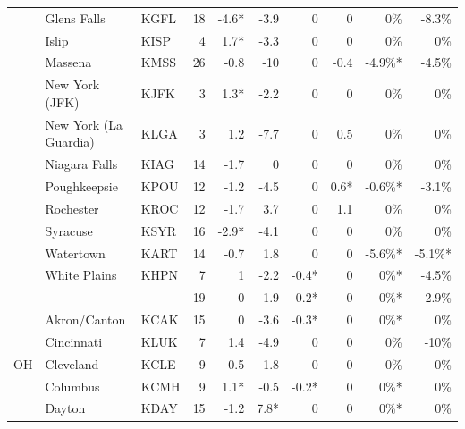 \documentclass[twocol]{ametsoc}
\begin{document}
\begin{landscape}
\begin{table}[]
\begin{tabular}{@{}cllrrrrrrr@{}}
                     & Glens Falls                & KGFL & 18   & -4.6* & -3.9  & 0     & 0    & 0\%     & -8.3\%   \\
                     & Islip                      & KISP & 4    & 1.7*  & -3.3  & 0     & 0    & 0\%     & 0\%      \\
                     & Massena                    & KMSS & 26   & -0.8  & -10   & 0     & -0.4 & -4.9\%* & -4.5\%   \\
                     & New York (JFK)             & KJFK & 3    & 1.3*  & -2.2  & 0     & 0    & 0\%     & 0\%      \\
                     & New York (La Guardia)      & KLGA & 3    & 1.2   & -7.7  & 0     & 0.5  & 0\%     & 0\%      \\
                     & Niagara Falls              & KIAG & 14   & -1.7  & 0     & 0     & 0    & 0\%     & 0\%      \\
                     & Poughkeepsie               & KPOU & 12   & -1.2  & -4.5  & 0     & 0.6* & -0.6\%* & -3.1\%   \\
                     & Rochester                  & KROC & 12   & -1.7  & 3.7   & 0     & 1.1  & 0\%     & 0\%      \\
                     & Syracuse                   & KSYR & 16   & -2.9* & -4.1  & 0     & 0    & 0\%     & 0\%      \\
                     & Watertown                  & KART & 14   & -0.7  & 1.8   & 0     & 0    & -5.6\%* & -5.1\%*  \\
                     & White Plains               & KHPN & 7    & 1     & -2.2  & -0.4* & 0    & 0\%*    & -4.5\%   \\ \cmidrule(l){2-10} 
                     &                            &      & 19   & 0     & 1.9   & -0.2* & 0    & 0\%*    & -2.9\%   \\ \midrule
\multirow{9}{*}{OH}  & Akron/Canton               & KCAK & 15   & 0     & -3.6  & -0.3* & 0    & 0\%*    & 0\%      \\
                     & Cincinnati                 & KLUK & 7    & 1.4   & -4.9  & 0     & 0    & 0\%     & -10\%    \\
                     & Cleveland                  & KCLE & 9    & -0.5  & 1.8   & 0     & 0    & 0\%     & 0\%      \\
                     & Columbus                   & KCMH & 9    & 1.1*  & -0.5  & -0.2* & 0    & 0\%*    & 0\%      \\
                     & Dayton                     & KDAY & 15   & -1.2  & 7.8*  & 0     & 0    & 0\%*    & 0\%      \\

\end{tabular}
\end{table}
\end{landscape}
\end{document}
